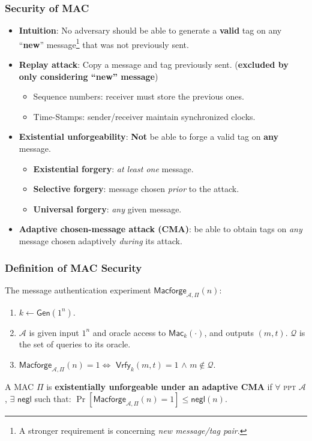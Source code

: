 \begin{frame}\frametitle{Security of MAC}
\begin{itemize}
\item \textbf{Intuition}: No adversary should be able to generate a \textbf{valid} tag on any ``\textbf{new}'' message\footnote{A stronger requirement is concerning \emph{new message/tag pair}.} that was not previously sent.
\item \textbf{Replay attack}: Copy a message and tag previously sent. (\textbf{excluded by only considering ``new'' message})
\begin{itemize}
\item Sequence numbers: receiver must store the previous ones.
\item Time-Stamps: sender/receiver maintain synchronized clocks.
\end{itemize}
\item \textbf{Existential unforgeability}: \textbf{Not} be able to forge a valid tag on \textbf{any} message.
\begin{itemize}
\item \textbf{Existential forgery}: \emph{at least one} message.
\item \textbf{Selective forgery}: message chosen \emph{prior} to the attack.
\item \textbf{Universal forgery}: \emph{any} given message.
\end{itemize}
\item \textbf{Adaptive chosen-message attack (CMA)}: be able to obtain tags on \emph{any} message chosen adaptively \emph{during} its attack.
\end{itemize}
\end{frame}
\begin{frame}\frametitle{Definition of MAC Security}
The message authentication experiment $\mathsf{Macforge}_{\mathcal{A},\Pi }(n)$:
\begin{enumerate}
\item $k \gets \mathsf{Gen}(1^n)$.
\item $\mathcal{A}$ is given input $1^n$ and oracle access to $\mathsf{Mac}_k(\cdot)$, and outputs $(m,t)$. $\mathcal{Q}$ is the set of queries to its oracle.
\item $\mathsf{Macforge}_{\mathcal{A},\Pi }(n)=1 \iff$ $\mathsf{Vrfy}_k(m,t)=1$ $\land$ $m \notin \mathcal{Q}$. 
\end{enumerate}
\begin{figure}
\begin{center}

\end{center}
\end{figure}
\begin{definition}
A MAC $\Pi$ is \textbf{existentially unforgeable under an adaptive CMA} if $\forall$ \textsc{ppt} $\mathcal{A}$, $\exists$ $\mathsf{negl}$ such that:
$ \Pr [\mathsf{Macforge}_{\mathcal{A},\Pi }(n)=1] \le \mathsf{negl}(n). $
\end{definition}
\end{frame}
